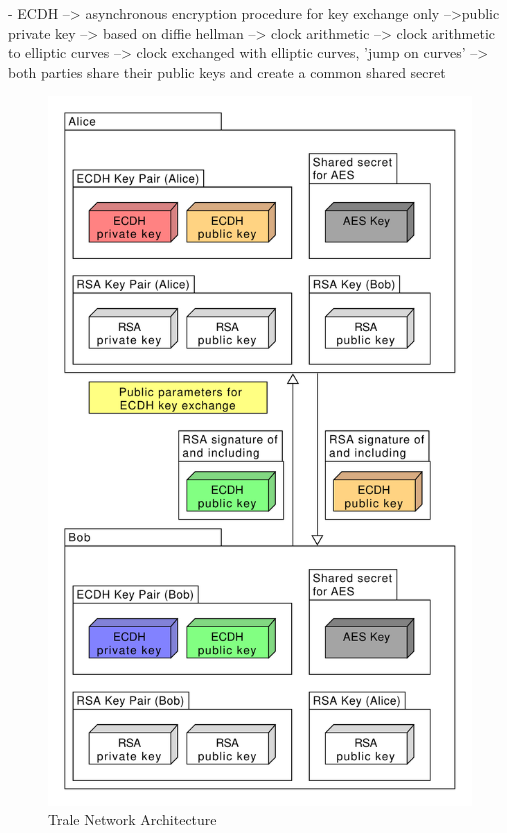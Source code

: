 - ECDH --> asynchronous encryption procedure for key exchange only -->public private key
--> based on diffie hellman --> clock arithmetic
--> clock arithmetic to elliptic curves --> clock exchanged with elliptic curves, 'jump on curves'
--> both parties share their public keys and create a common shared secret


\begin{figure}[H]
    \centering
    \includegraphics[width=1.0\textwidth]{./graphics/encryption}
    \caption{Trale Network Architecture}
    \label{fig:figure45}
\end{figure}




